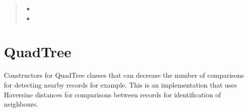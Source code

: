 \documentclass[letterpaper,10pt,english]{sphinxmanual}
\begin{document}
\begin{fulllineitems}
\begin{quote}
\begin{description}
\sphinxAtStartPar
\begin{itemize}
\item {} 
\sphinxAtStartPar
{}

\item {} 
\sphinxAtStartPar
{}

\end{itemize}


\end{description}\end{quote}

\end{fulllineitems}


\section{QuadTree}
\label{\detokenize{users_guide:quadtree}}\label{\detokenize{users_guide:module-GeoSpatialTools.quadtree}}
\sphinxAtStartPar
Constructors for QuadTree classes that can decrease the number of comparisons
for detecting nearby records for example. This is an implementation that uses
Haversine distances for comparisons between records for identification of
neighbours.
\end{document}
